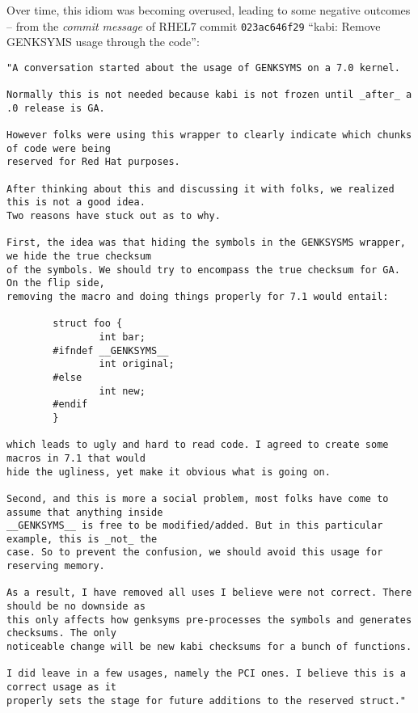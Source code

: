 \documentclass[10pt,oneside,english]{book}
\begin{document}
Over time, this idiom was becoming overused, leading to some negative
outcomes -- from the \emph{commit message} of RHEL7 commit \texttt{023ac646f29}
``kabi: Remove GENKSYMS usage through the code'':

\begin{lstlisting}[]
"A conversation started about the usage of GENKSYMS on a 7.0 kernel.

Normally this is not needed because kabi is not frozen until _after_ a .0 release is GA.

However folks were using this wrapper to clearly indicate which chunks of code were being
reserved for Red Hat purposes.

After thinking about this and discussing it with folks, we realized this is not a good idea.
Two reasons have stuck out as to why.

First, the idea was that hiding the symbols in the GENKSYSMS wrapper, we hide the true checksum
of the symbols. We should try to encompass the true checksum for GA. On the flip side,
removing the macro and doing things properly for 7.1 would entail:

        struct foo {
                int bar;
        #ifndef __GENKSYMS__
                int original;
        #else
                int new;
        #endif
        }

which leads to ugly and hard to read code. I agreed to create some macros in 7.1 that would
hide the ugliness, yet make it obvious what is going on.

Second, and this is more a social problem, most folks have come to assume that anything inside
__GENKSYMS__ is free to be modified/added. But in this particular example, this is _not_ the
case. So to prevent the confusion, we should avoid this usage for reserving memory.

As a result, I have removed all uses I believe were not correct. There should be no downside as
this only affects how genksyms pre-processes the symbols and generates checksums. The only
noticeable change will be new kabi checksums for a bunch of functions.

I did leave in a few usages, namely the PCI ones. I believe this is a correct usage as it
properly sets the stage for future additions to the reserved struct."
\end{lstlisting}
\end{document}
